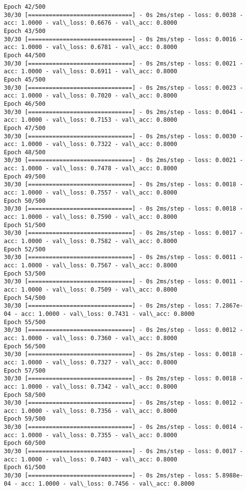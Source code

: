 \documentclass[11pt]{article}
\begin{document}
\begin{Verbatim}[commandchars=\\\{\}]
Epoch 42/500
30/30 [==============================] - 0s 2ms/step - loss: 0.0038 - acc: 1.0000 - val\_loss: 0.6676 - val\_acc: 0.8000
Epoch 43/500
30/30 [==============================] - 0s 2ms/step - loss: 0.0016 - acc: 1.0000 - val\_loss: 0.6781 - val\_acc: 0.8000
Epoch 44/500
30/30 [==============================] - 0s 2ms/step - loss: 0.0021 - acc: 1.0000 - val\_loss: 0.6911 - val\_acc: 0.8000
Epoch 45/500
30/30 [==============================] - 0s 2ms/step - loss: 0.0023 - acc: 1.0000 - val\_loss: 0.7020 - val\_acc: 0.8000
Epoch 46/500
30/30 [==============================] - 0s 2ms/step - loss: 0.0041 - acc: 1.0000 - val\_loss: 0.7153 - val\_acc: 0.8000
Epoch 47/500
30/30 [==============================] - 0s 2ms/step - loss: 0.0030 - acc: 1.0000 - val\_loss: 0.7322 - val\_acc: 0.8000
Epoch 48/500
30/30 [==============================] - 0s 2ms/step - loss: 0.0021 - acc: 1.0000 - val\_loss: 0.7478 - val\_acc: 0.8000
Epoch 49/500
30/30 [==============================] - 0s 2ms/step - loss: 0.0018 - acc: 1.0000 - val\_loss: 0.7557 - val\_acc: 0.8000
Epoch 50/500
30/30 [==============================] - 0s 2ms/step - loss: 0.0018 - acc: 1.0000 - val\_loss: 0.7590 - val\_acc: 0.8000
Epoch 51/500
30/30 [==============================] - 0s 2ms/step - loss: 0.0017 - acc: 1.0000 - val\_loss: 0.7582 - val\_acc: 0.8000
Epoch 52/500
30/30 [==============================] - 0s 2ms/step - loss: 0.0011 - acc: 1.0000 - val\_loss: 0.7567 - val\_acc: 0.8000
Epoch 53/500
30/30 [==============================] - 0s 2ms/step - loss: 0.0011 - acc: 1.0000 - val\_loss: 0.7509 - val\_acc: 0.8000
Epoch 54/500
30/30 [==============================] - 0s 2ms/step - loss: 7.2867e-04 - acc: 1.0000 - val\_loss: 0.7431 - val\_acc: 0.8000
Epoch 55/500
30/30 [==============================] - 0s 2ms/step - loss: 0.0012 - acc: 1.0000 - val\_loss: 0.7360 - val\_acc: 0.8000
Epoch 56/500
30/30 [==============================] - 0s 2ms/step - loss: 0.0018 - acc: 1.0000 - val\_loss: 0.7327 - val\_acc: 0.8000
Epoch 57/500
30/30 [==============================] - 0s 2ms/step - loss: 0.0018 - acc: 1.0000 - val\_loss: 0.7342 - val\_acc: 0.8000
Epoch 58/500
30/30 [==============================] - 0s 2ms/step - loss: 0.0012 - acc: 1.0000 - val\_loss: 0.7356 - val\_acc: 0.8000
Epoch 59/500
30/30 [==============================] - 0s 2ms/step - loss: 0.0014 - acc: 1.0000 - val\_loss: 0.7355 - val\_acc: 0.8000
Epoch 60/500
30/30 [==============================] - 0s 2ms/step - loss: 0.0017 - acc: 1.0000 - val\_loss: 0.7403 - val\_acc: 0.8000
Epoch 61/500
30/30 [==============================] - 0s 2ms/step - loss: 5.8988e-04 - acc: 1.0000 - val\_loss: 0.7456 - val\_acc: 0.8000

\end{Verbatim}
\end{document}
